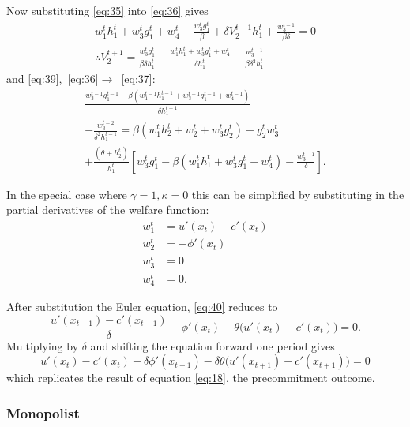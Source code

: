 \documentclass{amsart}
\begin{document}
Now substituting \eqref{eq:35} into \eqref{eq:36} gives
\begin{gather}
  \label{eq:38}
  w^t_1h^t_1 + w^t_3g^t_1 + w^t_4 - \frac{w^t_3g^t_1}{\beta} + \delta
  V^{t+1}_2h^t_1 + \frac{w^{t-1}_3}{\beta\delta} = 0 \\ \label{eq:39}
  \therefore V^{t+1}_2 = \frac{w^t_3g^t_1}{\beta\delta h^t_1} -
  \frac{w^t_1h^t_1 + w^t_3g^t_1 + w^t_4}{\delta h^t_1} -
  \frac{w^{t-1}_3}{\beta\delta^2 h^t_1}
\end{gather}
and \eqref{eq:39},~\eqref{eq:36}$\rightarrow$~\eqref{eq:37}:
\begin{multline}
  \label{eq:40}
  \frac{w^{t-1}_3g^{t-1}_1 - \beta\left( w^{t-1}_1h^{t-1}_1 +
      w^{t-1}_3g^{t-1}_1 + w^{t-1}_4 \right)}{\delta h^{t-1}_1} \\ -
  \frac{w^{t-2}_3}{\delta^2 h^{t-1}_1} =
  \beta ( w^t_1h^t_2 + w^t_2 + w^t_3g^t_2 ) - g^t_2w^t_3 \\
  +\frac{\left( \theta + h^t_2 \right)}{h^t_1} \left[ w^t_3g^t_1 -
    \beta\left( w^t_1h^t_1 + w^t_3g^t_1 + w^t_4 \right) -
    \frac{w^{t-1}_3}{\delta} \right].
\end{multline}

In the special case where $\gamma=1, \kappa=0$ this can be simplified
by substituting in the partial derivatives of the welfare function:
\begin{align}
  \label{eq:41}
  w^t_1 &= u'(x_t) - c'(x_t) \\ \label{eq:42} w^t_2 &= -\phi'(x_t)
  \\ \label{eq:43} w^t_3 &= 0 \\ \label{eq:44} w^t_4 &= 0.
\end{align}

After substitution the Euler equation, \eqref{eq:40} reduces to
\begin{equation}
  \label{eq:45}
  \frac{u'(x_{t-1}) - c'(x_{t-1})}{\delta} - \phi'(x_t) - \theta \big(
  u'(x_t) - c'(x_t) \big) = 0.
\end{equation}
Multiplying by $\delta$ and shifting the equation forward one period
gives
\begin{equation}
  \label{eq:46}
  u'(x_t) - c'(x_t) - \delta \phi'(x_{t+1}) - \delta\theta \big(
  u'(x_{t+1}) - c'(x_{t+1}) \big) = 0
\end{equation}
which replicates the result of equation \eqref{eq:18}, the
precommitment outcome.

\subsubsection{Monopolist}
\label{sec:monopolist-1}
\end{document}
